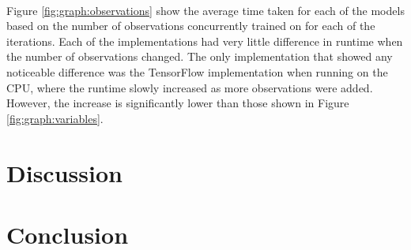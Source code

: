 \documentclass[12pt]{article}
\begin{document}
\paragraph{}
Figure \ref{fig:graph:observations} show the average time taken for each of the models based on the number of observations concurrently trained on for each of the iterations.
Each of the implementations had very little difference in runtime when the number of observations changed.
The only implementation that showed any noticeable difference was the TensorFlow implementation when running on the CPU, where the runtime slowly increased as more observations were added.
However, the increase is significantly lower than those shown in Figure \ref{fig:graph:variables}.

\section{Discussion}




%

\section{Conclusion}

%

\newpage


\end{document}
